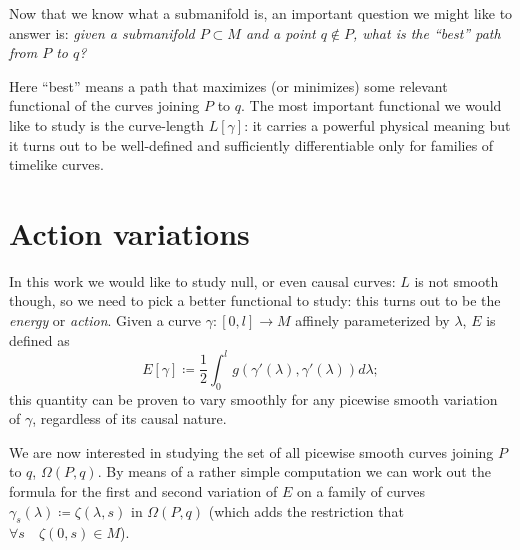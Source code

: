 
Now that we know what a submanifold is, an important question we might like to answer is: \emph{given a submanifold \(P\subset M\) and a point \(q \notin P\), what is the ``best'' path from \(P\) to \(q\)?} 

Here ``best'' means a path that maximizes (or minimizes) some relevant functional of the curves joining \(P\) to \(q\). The most important functional we would like to study is the curve-length \(L[\gamma]\): it carries a powerful physical meaning but it turns out to be well-defined and sufficiently differentiable only for families of timelike curves. 


\section[Action variations]{Action variations}

In this work we would like to study null, or even causal curves: \(L\) is not smooth though, so we need to pick a better functional to study: this turns out to be the \emph{energy} or \emph{action}. Given a curve \(\gamma : [0, l] \rightarrow M\) affinely parameterized by \(\lambda\), \(E\) is defined as
\begin{equation*}
E[\gamma] \coloneqq \frac{1}{2}\int_{0}^{l} g(\gamma'(\lambda), \gamma'(\lambda))d\lambda;
\end{equation*}
this quantity can be proven to vary smoothly for any picewise smooth variation of \(\gamma\), regardless of its causal nature.

We are now interested in studying the set of all picewise smooth curves joining \(P\) to \(q\), \(\Omega(P, q)\). By means of a rather simple computation we can work out the formula for the first and second variation of \(E\) on a family of curves \(\gamma_s(\lambda) \coloneqq
\zeta(\lambda, s)\) in \(\Omega(P, q)\) (which adds the restriction that \(\forall s \quad \zeta(0, s) \in M\)).


